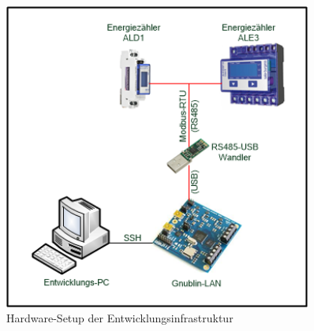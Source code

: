 \documentclass[Bachelorarbeit.tex]{subfiles}
\begin{document}
\begin{figure}[h]
\includegraphics[width=0.9\textwidth]{./img/Labor-Aufbau.png}
\caption{Hardware-Setup der Entwicklungsinfrastruktur}
\label{pic:labor_aufbau}
\end{figure}
\newpage

\end{document}
